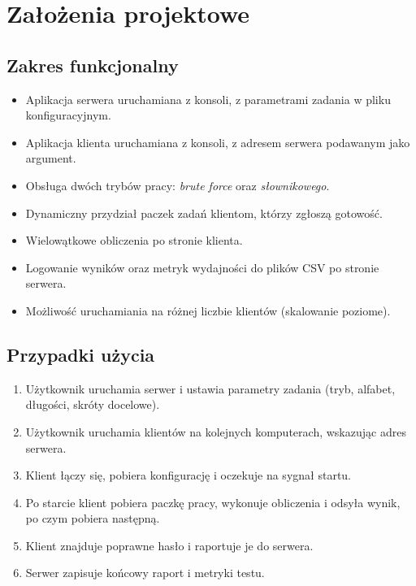 \documentclass[11pt,a4paper]{article}
\begin{document}
\section{Założenia projektowe}

\subsection{Zakres funkcjonalny}
\begin{itemize}
  \item Aplikacja serwera uruchamiana z konsoli, z parametrami zadania w pliku konfiguracyjnym.
  \item Aplikacja klienta uruchamiana z konsoli, z adresem serwera podawanym jako argument.
  \item Obsługa dwóch trybów pracy: \emph{brute force} oraz \emph{słownikowego}.
  \item Dynamiczny przydział paczek zadań klientom, którzy zgłoszą gotowość.
  \item Wielowątkowe obliczenia po stronie klienta.
  \item Logowanie wyników oraz metryk wydajności do plików CSV po stronie serwera.
  \item Możliwość uruchamiania na różnej liczbie klientów (skalowanie poziome).
\end{itemize}

\subsection{Przypadki użycia}
\begin{enumerate}
  \item Użytkownik uruchamia serwer i ustawia parametry zadania (tryb, alfabet, długości, skróty docelowe).
  \item Użytkownik uruchamia klientów na kolejnych komputerach, wskazując adres serwera.
  \item Klient łączy się, pobiera konfigurację i oczekuje na sygnał startu.
  \item Po starcie klient pobiera paczkę pracy, wykonuje obliczenia i odsyła wynik, po czym pobiera następną.
  \item Klient znajduje poprawne hasło i raportuje je do serwera.
  \item Serwer zapisuje końcowy raport i metryki testu.
\end{enumerate}
\end{document}
